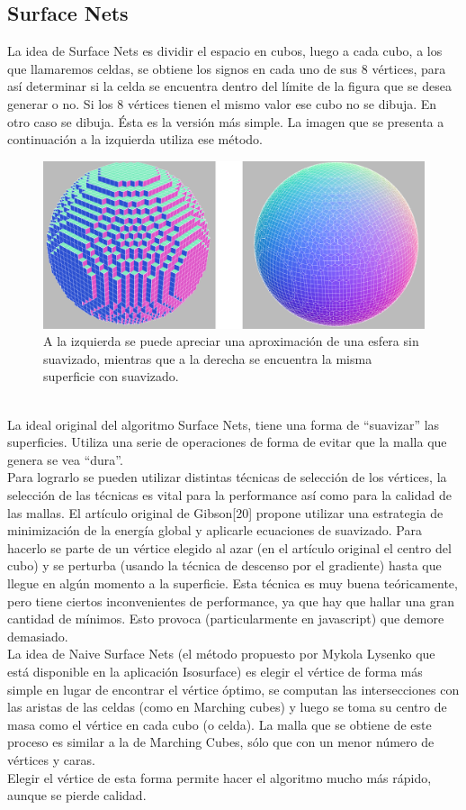 \documentclass[12pt]{article}
\begin{document}
\subsection{Surface Nets}
La idea de Surface Nets es dividir el espacio en cubos, luego a cada cubo, a los que llamaremos celdas, se obtiene los signos en cada uno de sus 8 vértices, para así determinar si la celda se encuentra dentro del límite de la figura que se desea generar o no. Si los 8 vértices tienen el mismo valor ese cubo no se dibuja. En otro caso se dibuja. Ésta es la versión más simple. La imagen que se presenta a continuación a la izquierda utiliza ese método.
\begin{figure}[h]
\includegraphics[width =\linewidth,center]{snc.png}
\caption{ A la izquierda se puede apreciar una aproximación de una esfera sin suavizado, mientras que a la derecha se encuentra la misma superficie con suavizado.}
\label{ fig : surface }
\end{figure}
\\La ideal original del algoritmo Surface Nets\cite{surfacenets}, tiene una forma de “suavizar” las superficies. Utiliza una serie de operaciones de forma de evitar que la malla que genera se vea “dura”.
\\Para lograrlo se pueden utilizar distintas técnicas de selección de los vértices, la selección de las técnicas es vital para la performance así como para la calidad de las mallas. El artículo original de Gibson[20]  propone utilizar una estrategia de minimización de la energía global y aplicarle ecuaciones de suavizado. Para hacerlo se parte de un vértice elegido al azar (en el artículo original el centro del cubo)  y se perturba (usando la técnica de descenso por el gradiente) hasta que llegue en algún momento a la superficie. Esta técnica es muy buena teóricamente, pero tiene ciertos inconvenientes de performance, ya que hay que hallar una gran cantidad de mínimos. Esto provoca (particularmente en javascript) que demore demasiado.
\\La idea de Naive Surface Nets (el método propuesto por Mykola Lysenko\cite{mykola2} que está disponible en la aplicación Isosurface) es elegir el vértice de forma más simple  en lugar de encontrar el vértice óptimo, se computan las intersecciones con las aristas de las celdas (como en Marching cubes) y luego se toma su centro de masa como el vértice en cada cubo (o celda). La malla que se obtiene de este proceso es similar a la de Marching Cubes, sólo que con un menor número de vértices y caras. 
\\Elegir el vértice de esta forma permite hacer el algoritmo mucho más rápido, aunque se pierde calidad.
\end{document}
